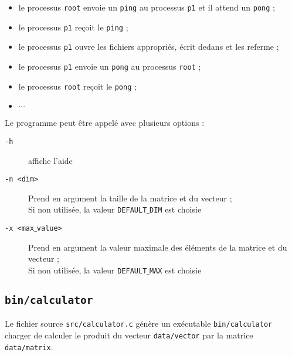 \documentclass[a4paper,10pt]{article}
\begin{document}
\begin{enumerate}
\begin{itemize}
    \item le processus \texttt{root} envoie un \texttt{ping} au processus \texttt{p1} et il attend un \texttt{pong} ;
    \item le processus \texttt{p1} reçoit le \texttt{ping} ;
    \item le processus \texttt{p1} ouvre les fichiers appropriés, écrit dedans et les referme ;
    \item le processus \texttt{p1} envoie un \texttt{pong} au processus \texttt{root} ;
    \item le processus \texttt{root} reçoit le \texttt{pong} ;
    \item $ \cdots $
  \end{itemize}
\end{enumerate}

\bigskip

Le programme peut être appelé avec plusieurs options :
\begin{description}
  \item[\texttt{-h}]affiche l'aide
  \item[\texttt{-n <dim>}]$ $\\Prend en argument la taille de la matrice et du vecteur ;\\Si non utilisée, la valeur \texttt{DEFAULT$\_$DIM} est choisie
  \item[\texttt{-x <max$\_$value>}]$ $\\Prend en argument la valeur maximale des éléments de la matrice et du vecteur ;\\Si non utilisée, la valeur \texttt{DEFAULT$\_$MAX} est choisie
\end{description}


\subsection{\texttt{bin/calculator}}

Le fichier source \texttt{src/calculator.c} génère un exécutable \texttt{bin/calculator} charger de calculer le produit du vecteur \texttt{data/vector} par la matrice \texttt{data/matrix}.
\end{document}
